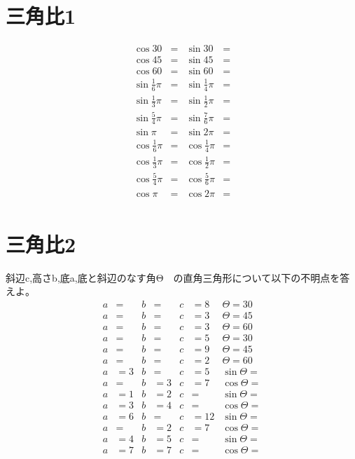 \documentclass[paper=b4j,landscape,twocolumn,fleqn]{jlreq}
\begin{document}
\section{三角比1}
\begin{align*}
  \cos{30} &= & \sin{30} &=\\
  \cos{45} &= & \sin{45} &=\\
  \cos{60} &= & \sin{60} &=\\
  \sin{\frac{1}{6}\pi} &= & \sin{\frac{1}{4}\pi} &=\\
  \sin{\frac{1}{3}\pi} &= & \sin{\frac{1}{2}\pi} &=\\
  \sin{\frac{5}{4}\pi} &= & \sin{\frac{7}{6}\pi} &=\\
  \sin{\pi} &= & \sin{2\pi} &=\\
  \cos{\frac{1}{6}\pi} &= & \cos{\frac{1}{4}\pi} &=\\
  \cos{\frac{1}{3}\pi} &= & \cos{\frac{1}{2}\pi} &=\\
  \cos{\frac{5}{4}\pi} &= & \cos{\frac{5}{6}\pi} &=\\
  \cos{\pi} &= & \cos{2\pi} &=\\
\end{align*}
\section{三角比2}
斜辺c,高さb,底a,底と斜辺のなす角Θ　の直角三角形について以下の不明点を答えよ。
\begin{align*}
  a &= & b &= & c &=8 & Θ=30 \\
  a &= & b &= & c &=3 & Θ=45 \\
  a &= & b &= & c &=3 & Θ=60 \\
  a &= & b &= & c &=5 & Θ=30 \\
  a &= & b &= & c &=9 & Θ=45 \\
  a &= & b &= & c &=2 & Θ=60 \\
  a &=3 & b &= & c &=5 & \sin{Θ}= \\
  a &= & b &=3 & c &=7 & \cos{Θ}= \\
  a &=1 & b &=2 & c &= & \sin{Θ}= \\
  a &=3 & b &=4 & c &= & \cos{Θ}= \\
  a &=6 & b &= & c &=12 & \sin{Θ}= \\
  a &= & b &=2 & c &=7 & \cos{Θ}= \\
  a &=4 & b &=5 & c &= & \sin{Θ}= \\
  a &=7 & b &=7 & c &= & \cos{Θ}= \\
\end{align*}
\end{document}
